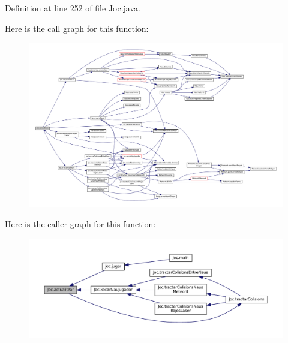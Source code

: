 Definition at line 252 of file Joc.\+java.



Here is the call graph for this function\+:
\nopagebreak
\begin{figure}[H]
\begin{center}
\leavevmode
\includegraphics[width=350pt]{class_joc_aafe85787281ae19be9ee44aabc5c116c_cgraph}
\end{center}
\end{figure}




Here is the caller graph for this function\+:
\nopagebreak
\begin{figure}[H]
\begin{center}
\leavevmode
\includegraphics[width=350pt]{class_joc_aafe85787281ae19be9ee44aabc5c116c_icgraph}
\end{center}
\end{figure}


\hypertarget{class_joc_a82b3c98f504183b2ade08ae6f7fbbdce}{}
